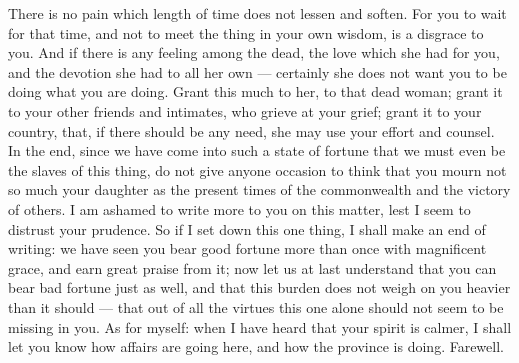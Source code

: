  There is no pain which length of time does not lessen and soften. For you to wait for that time, and not to meet the thing in your own wisdom, is a disgrace to you. And if there is any feeling among the dead, the love which she had for you, and the devotion she had to all her own --- certainly she does not want you to be doing what you are doing. Grant this much to her, to that dead woman; grant it to your other friends and intimates, who grieve at your grief; grant it to your country, that, if there should be any need, she may use your effort and counsel. In the end, since we have come into such a state of fortune that we must even be the slaves of this thing, do not give anyone occasion to think that you mourn not so much your daughter as the present times of the commonwealth and the victory of others. I am ashamed to write more to you on this matter, lest I seem to distrust your prudence. So if I set down this one thing, I shall make an end of writing: we have seen you bear good fortune more than once with magnificent grace, and earn great praise from it; now let us at last understand that you can bear bad fortune just as well, and that this burden does not weigh on you heavier than it should --- that out of all the virtues this one alone should not seem to be missing in you. As for myself: when I have heard that your spirit is calmer, I shall let you know how affairs are going here, and how the province is doing. Farewell.
